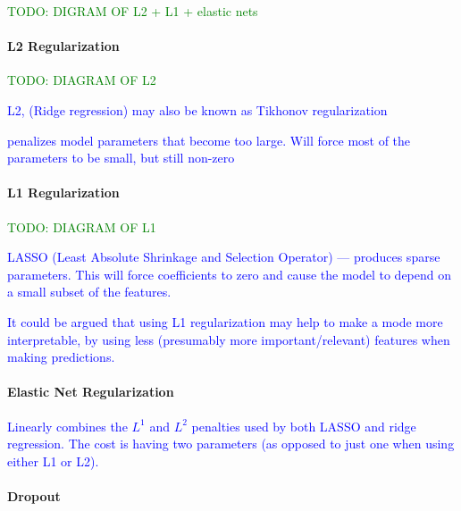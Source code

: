 \textcolor{green}{TODO: DIGRAM OF L2 + L1 + elastic nets}

\paragraph{L2 Regularization}

\textcolor{green}{TODO: DIAGRAM OF L2}

\textcolor{blue}{L2, ({Ridge regression}) may also be known as {Tikhonov regularization}}

\textcolor{blue}{penalizes model parameters that become too large. Will force most of the parameters to be small, but still non-zero}


\paragraph{L1 Regularization}

\textcolor{green}{TODO: DIAGRAM OF L1}

\textcolor{blue}{LASSO (Least Absolute Shrinkage and Selection Operator) --- produces sparse parameters. This will force coefficients to zero and cause the model to depend on a small subset of the features.}

\textcolor{blue}{It could be argued that using L1 regularization may help to make a mode more interpretable, by using less (presumably more important/relevant) features when making predictions.}


\paragraph{Elastic Net Regularization}

\textcolor{blue}{Linearly combines the $L^1$ and $L^2$ penalties used by both LASSO and ridge regression. The cost is having two parameters (as opposed to just one when using either L1 or L2).}


\paragraph{Dropout}




